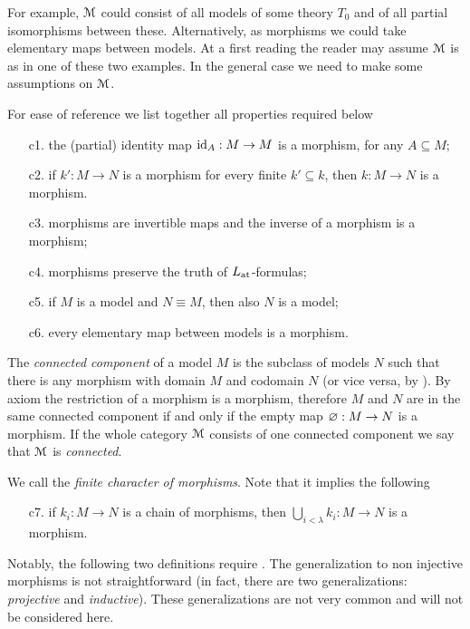 \documentclass[creche.tex]{subfiles}
\begin{document}
For example, $\EuScript M$ could consist of all models of some theory $T_0$ and of all partial isomorphisms between these.
Alternatively, as morphisms we could take elementary maps between models.
At a first reading the reader may assume $\EuScript M$ is as in one of these two examples.
In the general case we need to make some assumptions on $\EuScript M$.

\begin{definition}\label{def_com_c}For ease of reference we list together all properties required below
\begin{itemize} 
\item[c1.] the (partial) identity map $\textrm{id}_A:M\to M$ is a morphism, for any $A\subseteq M$;
\item[c2.] if $k':M\to N$ is a morphism for every finite $k'\subseteq k$, then $k:M\to N$ is a morphism.
\item[c3.] morphisms are invertible maps and the inverse of a morphism is a morphism;
\item[c4.] morphisms preserve the truth of $L_{\tiny\rm at}\hskip-.3ex$\,-formulas;
\item[c5.] if $M$ is a model and $N\equiv M$, then also $N$ is a model;
\item[c6.] every elementary map between models is a morphism.\QED
\end{itemize}
\end{definition}

The \emph{connected component\/} of a model $M$ is the subclass of models $N$ such that there is any morphism with domain $M$ and codomain $N$ (or vice versa, by ).
By axiom  the restriction of a morphism is a morphism, therefore $M$ and $N$ are in the same connected component if and only if the empty map $\varnothing:M\to N$ is a morphism.
If the whole category $\EuScript M$ consists of one connected component we say that $\EuScript M$ is \emph{connected}.

We call  the \emph{finite character of morphisms}.
Note that it implies the following

\begin{itemize} 
\item[c7.] if $k_i:M\to N$ is a chain of morphisms, then $\displaystyle\bigcup_{i<\lambda} k_i:M\to N$ is a morphism.
\end{itemize}

Notably, the following two definitions require .
The generalization to non injective morphisms is not straightforward (in fact, there are two generalizations: \textit{projective\/} and \textit{inductive\/}).
These generalizations are not very common and will not be considered here.
\end{document}
